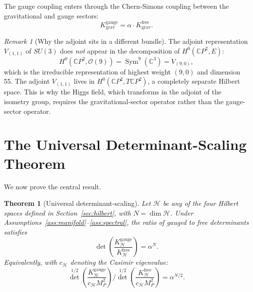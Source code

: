 \documentclass[11pt]{article}
\newtheorem{theorem}{Theorem}[section]
\theoremstyle{definition}
\theoremstyle{remark}
\newtheorem*{remark}{Remark}
\newcommand{\CP}{\mathbb{C}P}
\newcommand{\Sym}{\operatorname{Sym}}
\newcommand{\Mp}{M_P}
\begin{document}
The gauge coupling enters through the Chern-Simons coupling between the
gravitational and gauge sectors:
\begin{equation}
K^{\mathrm{gauge}}_{\mathrm{grav}} = \alpha \cdot K^{\mathrm{free}}_{\mathrm{grav}}.
\end{equation}

\begin{remark}[Why the adjoint sits in a different bundle]
The adjoint representation $V_{(1,1)}$ of $SU(3)$ does \textit{not}
appear in the decomposition of $H^0(\CP^2, E)$:
\begin{equation}
H^0(\CP^2, \mathcal{O}(9)) = \Sym^9(\mathbb{C}^3) = V_{(9,0)},
\end{equation}
which is the irreducible representation of highest weight $(9,0)$ and
dimension 55. The adjoint $V_{(1,1)}$ lives in $H^0(\CP^2, T\CP^2)$,
a completely separate Hilbert space. This is why the Higgs field, which
transforms in the adjoint of the isometry group, requires the
gravitational-sector operator rather than the gauge-sector operator.
\end{remark}


\section{The Universal Determinant-Scaling Theorem}
\label{sec:main}

We now prove the central result.

\begin{theorem}[Universal determinant-scaling]
\label{thm:main}
Let $\mathcal{H}$ be any of the four Hilbert spaces defined in
Section~\ref{sec:hilbert}, with $N = \dim \mathcal{H}$.
Under Assumptions~\ref{ass:manifold}--\ref{ass:spectral}, the ratio
of gauged to free determinants satisfies
\begin{equation}
\label{eq:main}
\boxed{\;
\det\!\left(\frac{K^{\mathrm{gauge}}_{\mathcal{H}}}{K^{\mathrm{free}}_{\mathcal{H}}}\right)
= \alpha^N.
\;}
\end{equation}
Equivalently, with $c_{\mathcal{H}}$ denoting the Casimir eigenvalue:
\begin{equation}
\label{eq:main-explicit}
\det^{1/2}\!\left(\frac{K^{\mathrm{gauge}}_{\mathcal{H}}}{c_{\mathcal{H}} \Mp^2}\right)
\bigg/
\det^{1/2}\!\left(\frac{K^{\mathrm{free}}_{\mathcal{H}}}{c_{\mathcal{H}} \Mp^2}\right)
= \alpha^{N/2}.
\end{equation}
\end{theorem}
\end{document}
